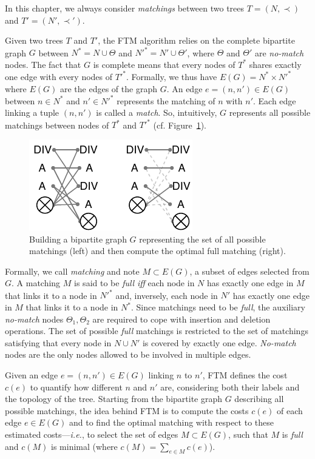 In this chapter, we always consider \emph{matchings} between two trees $T=(N,\prec)$ and $T'=(N',\prec')$.

Given two trees $T$ and $T'$, the FTM algorithm relies on the complete bipartite graph $G$ between $N^* = N\cup{\Theta}$ and $N'^* = N'\cup{\Theta}'$, where $\Theta$ and $\Theta'$ are \textit{no-match} nodes.
The fact that $G$ is complete means that every nodes of $T^*$ shares exactly one edge with every nodes of $T'^*$.
Formally, we thus have $E(G) = N^* \times N'^*$ where $E(G)$ are the edges of the graph $G$.
An edge $e=(n, n') \in E(G)$ between $n\in N^*$ and $n'\in N'^*$ represents the matching of $n$ with $n'$. Each edge linking a tuple $(n, n')$ is called a \textit{match}.
So, intuitively, $G$ represents all possible matchings between nodes of $T^*$ and $T'^*$ (cf. Figure~\ref{sftm:fig:g_SFTM}).

\begin{figure}
    \centering 
    \includegraphics[width=.5\textwidth]{tree-matching/explanation/g_ftm}
    \caption{Building a bipartite graph $G$ representing the set of all possible matchings (left) and then compute the optimal full matching (right).}
    \label{sftm:fig:g_SFTM}%
\end{figure}

Formally, we call \textit{matching} and note $M\subset E(G)$, a subset of edges selected from $G$.
A matching $M$ is said to be \textit{full} \emph{iff} each node in $N$ has exactly one edge in $M$ that links it to a node in $N'^*$ and, inversely, each node in $N'$ has exactly one edge in $M$ that links it to a node in $N^*$.
Since matchings need to be \textit{full}, the auxiliary \textit{no-match} nodes $\Theta_1, \Theta_2$ are required to cope with insertion and deletion operations.
The set of possible \textit{full} matchings is restricted to the set of matchings satisfying that every node in $N \cup N'$ is covered by exactly one edge.
\emph{No-match} nodes are the only nodes allowed to be involved in multiple edges.

Given an edge $e=(n, n')\in E(G)$ linking $n$ to $n'$, FTM defines the cost $c(e)$ to quantify how different $n$ and $n'$ are, considering both their labels and the topology of the tree.
Starting from the bipartite graph $G$ describing all possible matchings, the idea behind FTM is to compute the costs $c(e)$ of each edge $e\in E(G)$ and to find the optimal matching with respect to these estimated costs---\emph{i.e.}, to select the set of edges $M\subset E(G)$, such that $M$ is \textit{full} and $c(M)$ is minimal (where $c(M) = \sum_{e\in M}c(e)$).

